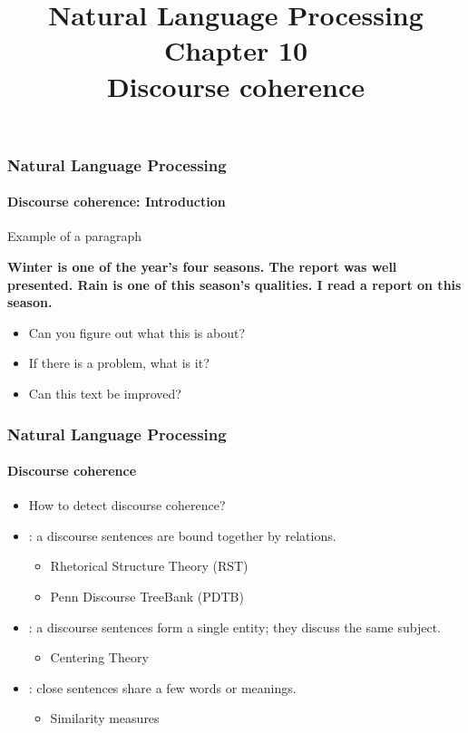 \documentclass[xcolor=table]{beamer}
\title[ESI - NLP: 10- Discourse coherence]%
{Natural Language Processing\\Chapter 10\\Discourse coherence}
\begin{document}
	
\begin{frame}
\frametitle{Natural Language Processing}
\framesubtitle{Discourse coherence: Introduction}

\begin{exampleblock}{Example of a paragraph}
	\begin{center}
		\Large\bfseries
		Winter is one of the year's four seasons.
		The report was well presented.
		Rain is one of this season's qualities.
		I read a report on this season.
	\end{center}
\end{exampleblock}

\begin{itemize}
	\item Can you figure out what this is about?
	\item If there is a problem, what is it?
	\item Can this text be improved?
\end{itemize}

\end{frame}

\begin{frame}
	\frametitle{Natural Language Processing}
	\framesubtitle{Discourse coherence}
	
	\begin{itemize}
		\item How to detect discourse coherence?
		\item {}: a discourse sentences are bound together by relations. 
		\begin{itemize}
			\item Rhetorical Structure Theory (RST) 
			\item Penn Discourse TreeBank (PDTB)
		\end{itemize}
		\item {}: a discourse sentences form a single entity; they discuss the same subject.
		\begin{itemize}
			\item Centering Theory 
		\end{itemize}
		\item {}: close sentences share a few words or meanings.
		\begin{itemize}
			\item Similarity measures
		\end{itemize}
	\end{itemize}
	
\end{frame}
\end{document}
